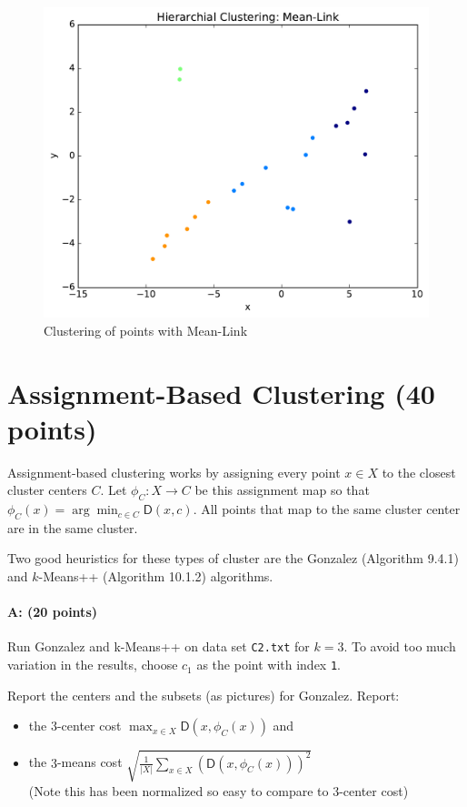 \documentclass[11pt]{article}
\newcommand{\D}{\textsf{D}}
\begin{document}
\begin{figure}[H]
\centering
\includegraphics[width=.75\textwidth]{Mean-Link.pdf}
\caption{Clustering of points with Mean-Link}
\end{figure}



\section{Assignment-Based Clustering (40 points)}

Assignment-based clustering works by assigning every point $x \in X$ to the closest cluster centers $C$.  Let $\phi_C : X \to C$ be this assignment map so that 
$\phi_C(x) = \arg \min_{c \in C} \D(x,c)$.  All points that map to the same cluster center are in the same cluster.  

Two good heuristics for these types of cluster are the 
\textsf{Gonzalez} (Algorithm 9.4.1) and \textsf{$k$-Means++} (Algorithm 10.1.2) algorithms.  

\paragraph{A: (20 points)}
Run \textsf{Gonzalez} and \textsf{k-Means++} on data set \texttt{C2.txt} for $k=3$. 
To avoid too much variation in the results, choose $c_1$ as the point with index \texttt{1}.  

Report the centers and the subsets (as pictures) for \textsf{Gonzalez}.  Report:
\begin{itemize} \denselist
\item the $3$-center cost $\max_{x \in X} \D(x,\phi_C(x))$  and 
\item the $3$-means cost $\sqrt{\frac{1}{|X|}\sum_{x \in X} (\D(x,\phi_C(x)))^2}$
  \\ (Note this has been normalized so easy to compare to $3$-center cost)
\end{itemize}
\end{document}
